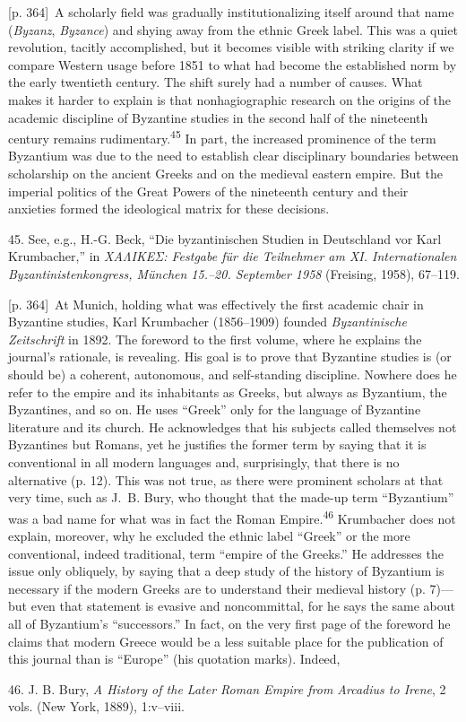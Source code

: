\documentclass[10pt,a4paper]{article}
\begin{document}
{\scriptsize\color{gray}[p. 364]}\ A scholarly field was gradually institutionalizing itself around that name (\textit{Byzanz}, \textit{Byzance}) and shying away from the ethnic Greek label. This was a quiet revolution, tacitly accomplished, but it becomes visible with striking clarity if we compare Western usage before 1851 to what had become the established norm by the early twentieth century. The shift surely had a number of causes. What makes it harder to explain is that nonhagiographic research on the origins of the academic discipline of Byzantine studies in the second half of the nineteenth century remains rudimentary.\nobreak\textsuperscript{45} In part, the increased prominence of the term Byzantium was due to the need to establish clear disciplinary boundaries between scholarship on the ancient Greeks and on the medieval eastern empire. But the imperial politics of the Great Powers of the nineteenth century and their anxieties formed the ideological matrix for these decisions.\par{\small 45. See, e.g., H.-G. Beck, “Die byzantinischen Studien in Deutschland vor Karl Krumbacher,” in \textit{ΧΑΛΙΚΕΣ: Festgabe für die Teilnehmer am XI. Internationalen Byzantinistenkongress, München 15.–20. September 1958} (Freising, 1958), 67–119.\par}
{\scriptsize\color{gray}[p. 364]}\ At Munich, holding what was effectively the first academic chair in Byzantine studies, Karl Krumbacher (1856–1909) founded \textit{Byzantinische Zeitschrift} in 1892. The foreword to the first volume, where he explains the journal’s rationale, is revealing. His goal is to prove that Byzantine studies is (or should be) a coherent, autonomous, and self-standing discipline. Nowhere does he refer to the empire and its inhabitants as Greeks, but always as Byzantium, the Byzantines, and so on. He uses “Greek” only for the language of Byzantine literature and its church. He acknowledges that his subjects called themselves not Byzantines but Romans, yet he justifies the former term by saying that it is conventional in all modern languages and, surprisingly, that there is no alternative (p. 12). This was not true, as there were prominent scholars at that very time, such as J. B. Bury, who thought that the made-up term “Byzantium” was a bad name for what was in fact the Roman Empire.\nobreak\textsuperscript{46} Krumbacher does not explain, moreover, why he excluded the ethnic label “Greek” or the more conventional, indeed traditional, term “empire of the Greeks.” He addresses the issue only obliquely, by saying that a deep study of the history of Byzantium is necessary if the modern Greeks are to understand their medieval history (p. 7)—but even that statement is evasive and noncommittal, for he says the same about all of Byzantium’s “successors.” In fact, on the very first page of the foreword he claims that modern Greece would be a less suitable place for the publication of this journal than is “Europe” (his quotation marks). Indeed,\par{\small 46. J. B. Bury, \textit{A History of the Later Roman Empire from Arcadius to Irene}, 2 vols. (New York, 1889), 1:v–viii.\par}
\end{document}
